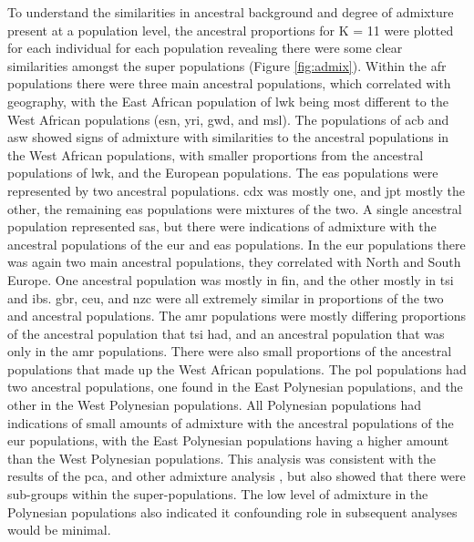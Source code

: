 \documentclass[twoside,openright]{report}
\begin{document}
To understand the similarities in ancestral background and degree of
admixture present at a population level, the ancestral proportions for K
= 11 were plotted for each individual for each population revealing
there were some clear similarities amongst the super populations (Figure
\ref{fig:admix}). Within the \gls{afr} populations there were three main
ancestral populations, which correlated with geography, with the East
African population of \gls{lwk} being most different to the West African
populations (\gls{esn}, \gls{yri}, \gls{gwd}, and \gls{msl}). The
populations of \gls{acb} and \gls{asw} showed signs of admixture with
similarities to the ancestral populations in the West African
populations, with smaller proportions from the ancestral populations of
\gls{lwk}, and the European populations. The \gls{eas} populations were
represented by two ancestral populations. \Gls{cdx} was mostly one, and
\gls{jpt} mostly the other, the remaining \gls{eas} populations were
mixtures of the two. A single ancestral population represented
\gls{sas}, but there were indications of admixture with the ancestral
populations of the \gls{eur} and \gls{eas} populations. In the \gls{eur}
populations there was again two main ancestral populations, they
correlated with North and South Europe. One ancestral population was
mostly in \gls{fin}, and the other mostly in \gls{tsi} and \gls{ibs}.
\gls{gbr}, \gls{ceu}, and \gls{nzc} were all extremely similar in
proportions of the two and ancestral populations. The \gls{amr}
populations were mostly differing proportions of the ancestral
population that \gls{tsi} had, and an ancestral population that was only
in the \gls{amr} populations. There were also small proportions of the
ancestral populations that made up the West African populations. The
\gls{pol} populations had two ancestral populations, one found in the
East Polynesian populations, and the other in the West Polynesian
populations. All Polynesian populations had indications of small amounts
of admixture with the ancestral populations of the \gls{eur}
populations, with the East Polynesian populations having a higher amount
than the West Polynesian populations. This analysis was consistent with
the results of the \gls{pca}, and other admixture analysis
\citep{Hellenthal2014, 1KGP2015snp}, but also showed that there were
sub-groups within the super-populations. The low level of admixture in
the Polynesian populations also indicated it confounding role in
subsequent analyses would be minimal.
\end{document}
